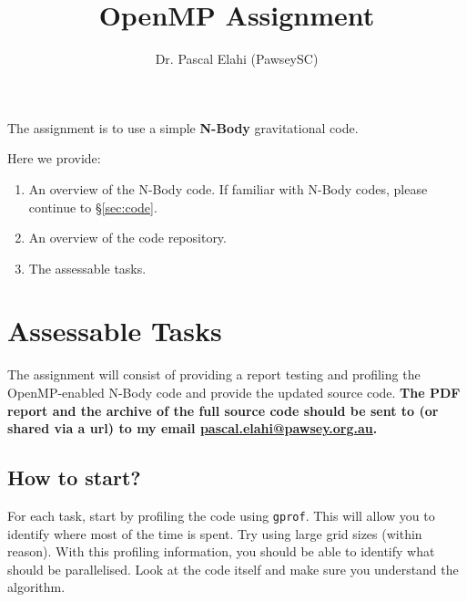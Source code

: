 \documentclass[11pt]{amsart}
\title[OpenMP]{OpenMP Assignment}
\author[]{Dr. Pascal Elahi (PawseySC)}
\begin{document}
\maketitle
\pagestyle{plain}
The assignment is to use a simple \textbf{N-Body} gravitational code. 

Here we provide:
\begin{enumerate}
	\item[\S\ref{sec:nbody}:] An overview of the N-Body code. If familiar with N-Body codes, please continue to \S\ref{sec:code}.
	\item[\S\ref{sec:code}:] An overview of the code repository. 
  \item[\S\ref{sec:tasks}:] The assessable tasks.  
\end{enumerate}



\newpage
\section{Assessable Tasks}\label{sec:tasks}
\begin{center}
  \large
  The assignment will consist of providing a report testing and profiling the OpenMP-enabled N-Body code and provide the updated source code. 
  \textbf{The PDF report and the archive of the full source code should be sent to (or shared via a url) to my email \href{mailto:pascal.elahi@pawsey.org.au}{pascal.elahi@pawsey.org.au}. }
\end{center}
\subsection*{How to start?\nopunct\\} \label{sec:tasks:staring}
For each task, start by profiling the code using \texttt{gprof}. This will allow you to identify where most of the time is spent. Try using large grid sizes (within reason). With this profiling information, you should be able to identify what should be parallelised. Look at the code itself and make sure you understand the algorithm.
\end{document}
